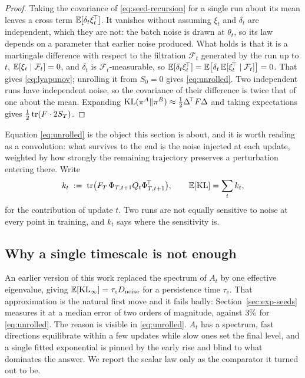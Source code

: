 \begin{proof}
  Taking the covariance of \eqref{eq:seed-recursion} for a single run about its mean leaves a
  cross term $\mathbb{E}[\delta_t \xi_t^{\!\top}]$. It vanishes without assuming $\xi_t$ and $\delta_t$ are
  independent, which they are not: the batch noise is drawn at $\theta_t$, so its law depends on a
  parameter that earlier noise produced. What holds is that it is a martingale difference with
  respect to the filtration $\mathcal{F}_t$ generated by the run up to $t$,
  $\mathbb{E}[\xi_t \mid \mathcal{F}_t] = 0$, and $\delta_t$ is $\mathcal{F}_t$-measurable, so
  $\mathbb{E}[\delta_t\xi_t^{\!\top}] = \mathbb{E}\big[\delta_t\,\mathbb{E}[\xi_t^{\!\top}\mid\mathcal{F}_t]\big] = 0$.
  That gives \eqref{eq:lyapunov}; unrolling it from $S_0 = 0$ gives \eqref{eq:unrolled}. Two independent runs have independent noise, so the covariance of
  their difference is twice that of one about the mean. Expanding
  $\mathrm{KL}(\pi^A\|\pi^B) \approx \tfrac{1}{2}\Delta^{\!\top}F\Delta$ and taking expectations gives
  $\tfrac{1}{2}\operatorname{tr}(F\cdot 2S_T)$.
\end{proof}

Equation \eqref{eq:unrolled} is the object this section is about, and it is worth reading as a
convolution: what survives to the end is the noise injected at each update, weighted by how
strongly the remaining trajectory preserves a perturbation entering there. Write
\begin{equation}
  \label{eq:kernel}
  k_t \;:=\; \operatorname{tr}\!\big(F_T\, \Phi_{T,t+1} Q_t \Phi_{T,t+1}^{\!\top}\big),
  \qquad
  \mathbb{E}[\mathrm{KL}] = \sum_{t} k_t,
\end{equation}
for the contribution of update $t$. Two runs are not equally sensitive to noise at every point in
training, and $k_t$ says where the sensitivity is.

\subsection{Why a single timescale is not enough}

An earlier version of this work replaced the spectrum of $A_t$ by one effective eigenvalue,
giving $\mathbb{E}[\mathrm{KL}_\infty] = \tau_c D_{\mathrm{noise}}$ for a persistence time $\tau_c$. That
approximation is the natural first move and it fails badly:
Section~\ref{sec:exp-seeds} measures it at a median error of two orders of magnitude, against
$3\%$ for \eqref{eq:unrolled}. The reason is visible in \eqref{eq:unrolled}. $A_t$ has a spectrum,
fast directions equilibrate within a few updates while slow ones set the final level, and a single
fitted exponential is pinned by the early rise and blind to what dominates the answer. We report
the scalar law only as the comparator it turned out to be.

